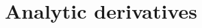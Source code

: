 \documentclass[a4paper,11pt]{article}
\begin{document}







\newpage

\appendix

\section{Analytic derivatives}\label{sec:appendix}
\end{document}
